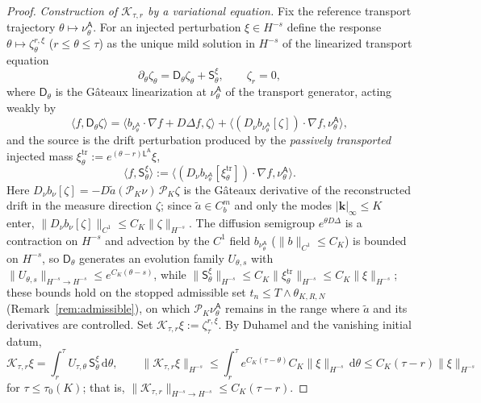 \documentclass[a4paper,fleqn]{cas-sc}
\theoremstyle{definition}
\theoremstyle{remark}
\begin{document}
\begin{proof}
\emph{Construction of $\mathcal K_{\tau,r}$ by a variational equation.} Fix the
reference transport trajectory $\theta\mapsto\nu^{\mathsf A}_\theta$. For an injected
perturbation $\xi\in H^{-s}$ define the response $\theta\mapsto\zeta^{r,\xi}_\theta$
($r\le\theta\le\tau$) as the unique mild solution in $H^{-s}$ of the linearized
transport equation
\begin{equation}\label{eq:varK}
\partial_\theta\zeta_\theta=\mathsf D_\theta\zeta_\theta+\mathsf S^\xi_\theta,
\qquad\zeta_r=0,
\end{equation}
where $\mathsf D_\theta$ is the G\^ateaux linearization at $\nu^{\mathsf A}_\theta$ of
the transport generator, acting weakly by
\[
\langle f,\mathsf D_\theta\zeta\rangle
=\langle b_{\nu^{\mathsf A}_\theta}\!\cdot\!\nabla f+D\Delta f,\zeta\rangle
+\langle(D_\nu b_{\nu^{\mathsf A}_\theta}[\zeta])\!\cdot\!\nabla f,\nu^{\mathsf A}_\theta\rangle,
\]
and the source is the drift perturbation produced by the \emph{passively
transported} injected mass $\xi_\theta^{\mathrm{tr}}:=e^{(\theta-r)\mathsf L^{\mathsf A}}\xi$,
\[
\langle f,\mathsf S^\xi_\theta\rangle:=\langle(D_\nu b_{\nu^{\mathsf A}_\theta}[\xi_\theta^{\mathrm{tr}}])\!\cdot\!\nabla f,\nu^{\mathsf A}_\theta\rangle.
\]
Here $D_\nu b_\nu[\zeta]=-D\tilde a(\mathcal P_K\nu)\,\mathcal P_K\zeta$ is the
G\^ateaux derivative of the reconstructed drift in the measure direction $\zeta$;
since $\tilde a\in C^m_b$ and only the modes $|\mathbf k|_\infty\le K$ enter,
$\|D_\nu b_\nu[\zeta]\|_{C^1}\le C_K\|\zeta\|_{H^{-s}}$. The diffusion semigroup
$e^{\theta D\Delta}$ is a contraction on $H^{-s}$ and advection by the $C^1$ field
$b_{\nu^{\mathsf A}_\theta}$ ($\|b\|_{C^1}\le C_K$) is bounded on $H^{-s}$, so
$\mathsf D_\theta$ generates an evolution family $U_{\theta,s}$ with
$\|U_{\theta,s}\|_{H^{-s}\to H^{-s}}\le e^{C_K(\theta-s)}$, while
$\|\mathsf S^\xi_\theta\|_{H^{-s}}\le C_K\|\xi^{\mathrm{tr}}_\theta\|_{H^{-s}}\le C_K\|\xi\|_{H^{-s}}$;
these bounds hold on the stopped admissible set $t_n\le T\wedge\theta_{K,R,N}$
(Remark~\ref{rem:admissible}), on which $\mathcal P_K\nu^{\mathsf A}_\theta$ remains in
the range where $\tilde a$ and its derivatives are controlled. Set
$\mathcal K_{\tau,r}\xi:=\zeta^{r,\xi}_\tau$. By Duhamel and the vanishing initial
datum,
\[
\mathcal K_{\tau,r}\xi=\int_r^\tau U_{\tau,\theta}\,\mathsf S^\xi_\theta\,\mathrm d\theta,
\qquad
\|\mathcal K_{\tau,r}\xi\|_{H^{-s}}\le\int_r^\tau e^{C_K(\tau-\theta)}C_K\|\xi\|_{H^{-s}}\,\mathrm d\theta
\le C_K(\tau-r)\|\xi\|_{H^{-s}}
\]
for $\tau\le\tau_0(K)$; that is, $\|\mathcal K_{\tau,r}\|_{H^{-s}\to H^{-s}}\le C_K(\tau-r)$.

\end{proof}
\end{document}
